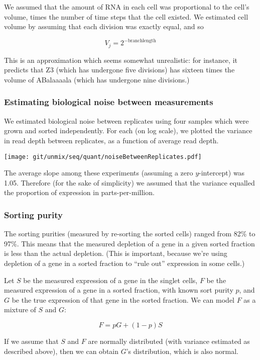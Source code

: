 \documentclass{article}
\begin{document}
We assumed that the amount of RNA in each cell was proportional to the cell's volume,
times the number of time steps that the cell existed.
We estimated cell volume by assuming that each division was exactly equal, and so

\[
V_j = 2^{-\mathrm{branchlength}}
\]

This is an approximation which seems somewhat unrealistic: for instance, it predicts
that Z3 (which has undergone five divisions) has sixteen times the volume of 
ABalaaaala (which has undergone nine divisions.)

\subsubsection*{Estimating biological noise between measurements}

We estimated biological noise between replicates using four samples which were
grown and sorted independently. For each (on log scale), we plotted the variance
in read depth between replicates, as a function of average read depth.

\texttt{[image: git/unmix/seq/quant/noiseBetweenReplicates.pdf]}

The average slope among these experiments (assuming a zero $y$-intercept) was 1.05.
Therefore (for the sake of simplicity)
we assumed that the variance equalled the proportion of expression in parts-per-million.

\subsubsection*{Sorting purity}

The sorting purities (measured by re-sorting the sorted cells) ranged from 82\% to 97\%.
This means that the measured depletion of a gene in a given sorted fraction is less than
the actual depletion. (This is important, because we're using depletion of a gene in a
sorted fraction to ``rule out'' expression in some cells.)

Let $S$ be the measured expression of a gene in the singlet cells,
$F$ be the
measured expression of a gene in a sorted fraction, with known sort purity $p$, and
$G$ be the true expression of that gene in the sorted fraction.
We can model $F$ as a mixture of $S$ and $G$:

\[
F = pG + (1-p)S
\]

If we assume that $S$ and $F$ are normally distributed (with variance estimated as described
above), then we can obtain $G$'s distribution, which is also normal.
\end{document}
